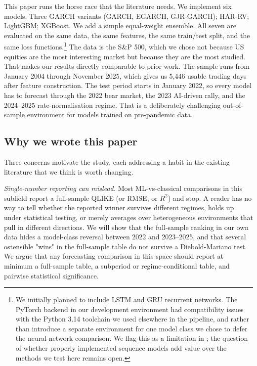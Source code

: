 This paper runs the horse race that the literature needs. We implement
six models. Three GARCH variants (GARCH, EGARCH, GJR-GARCH); HAR-RV;
LightGBM; XGBoost. We add a simple equal-weight ensemble. All seven are
evaluated on the same data, the same features, the same train/test split,
and the same loss functions.\footnote{We initially planned to include
LSTM and GRU recurrent networks. The PyTorch backend in our development
environment had compatibility issues with the Python 3.14 toolchain we
used elsewhere in the pipeline, and rather than introduce a separate
environment for one model class we chose to defer the neural-network
comparison. We flag this as a limitation in ; the
question of whether properly implemented sequence models add value over
the methods we test here remains open.} The data is the S\&P 500, which
we chose not because US equities are the most interesting market but
because they are the most studied. That makes our results directly
comparable to prior work. The sample runs from January 2004 through
November 2025, which gives us 5{,}446 usable trading days after feature
construction. The test period starts in January 2022, so every model has
to forecast through the 2022 bear market, the 2023 AI-driven rally, and
the 2024--2025 rate-normalisation regime. That is a deliberately
challenging out-of-sample environment for models trained on pre-pandemic
data.

\subsection*{Why we wrote this paper}

Three concerns motivate the study, each addressing a habit in the existing literature that we think is worth changing.

\textit{Single-number reporting can mislead.} Most ML-vs-classical comparisons in this subfield report a full-sample QLIKE (or RMSE, or $R^2$) and stop. A reader has no way to tell whether the reported winner survives different regimes, holds up under statistical testing, or merely averages over heterogeneous environments that pull in different directions. We will show that the full-sample ranking in our own data hides a model-class reversal between 2022 and 2023--2025, and that several ostensible "wins" in the full-sample table do not survive a Diebold-Mariano test. We argue that any forecasting comparison in this space should report at minimum a full-sample table, a subperiod or regime-conditional table, and pairwise statistical significance.

